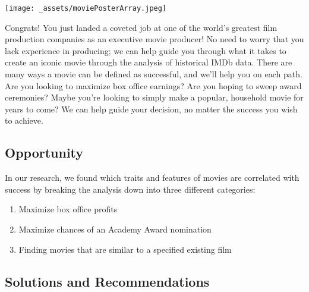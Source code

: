 \documentclass[10pt]{article}
\begin{document}
\begin{center}
\texttt{[image: \_assets/moviePosterArray.jpeg]}
\end{center}


\quad Congrats! You just landed a coveted job at one of the world’s greatest film production companies as an executive movie producer! No need to worry that you lack experience in producing; we can help guide you through what it takes to create an iconic movie through the analysis of historical IMDb data. There are many ways a movie can be defined as successful, and we’ll help you on each path. Are you looking to maximize box office earnings? Are you hoping to sweep award ceremonies? Maybe you’re looking to simply make a popular, household movie for years to come? We can help guide your decision, no matter the success you wish to achieve. 

\begin{center}
\section*{Opportunity}
\end{center}

\quad In our research, we found which traits and features of movies are correlated with success by breaking the analysis down into three different categories:

\begin{enumerate}
\item Maximize box office profits
\item Maximize chances of an Academy Award nomination
\item Finding movies that are similar to a specified existing film
\end{enumerate}

\begin{center}
\section*{Solutions and Recommendations}
\end{center}
\end{document}
